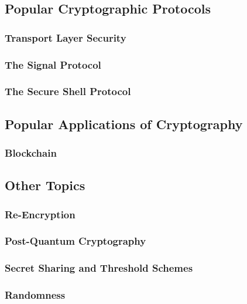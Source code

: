 \subsection{Popular Cryptographic Protocols}\label{future_sec:popular_cryptographic_protocols}
\subsubsection{Transport Layer Security}\label{future_sec:popular_protocols:tls}
\subsubsection{The Signal Protocol}\label{future_sec:popular_protocols:signal}
\subsubsection{The Secure Shell Protocol}\label{future_sec:popular_protocols:ssh}

\subsection{Popular Applications of Cryptography}\label{future_sec:popular_applications}
\subsubsection{Blockchain}\label{future_sec:popular_applications:blockchain}

\subsection{Other Topics}
\subsubsection{Re-Encryption}\label{future_sec:re_encryption}
\subsubsection{Post-Quantum Cryptography}\label{future_sec:post_quantum_cryptography}
\subsubsection{Secret Sharing and Threshold Schemes}\label{future_sec:secret_sharing_and_threshold_schemes}
\subsubsection{Randomness}\label{future_sec:randomness}
